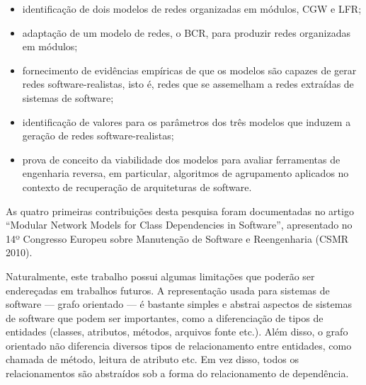 \begin{itemize}
	\item identificação de dois modelos de redes organizadas em módulos, CGW e LFR;
	\item adaptação de um modelo de redes, o BCR, para produzir redes organizadas em módulos;
	\item fornecimento de evidências empíricas de que os modelos são capazes de gerar redes software-realistas, isto é, redes que se assemelham a redes extraídas de sistemas de software;
	\item identificação de valores para os parâmetros dos três modelos que induzem a geração de redes software-realistas;
	\item prova de conceito da viabilidade dos modelos para avaliar ferramentas de engenharia reversa, em particular, algoritmos de agrupamento aplicados no contexto de recuperação de arquiteturas de software. 
\end{itemize}

As quatro primeiras contribuições desta pesquisa foram documentadas no artigo ``Modular Network Models for Class Dependencies in Software'', apresentado no 14º Congresso Europeu sobre Manutenção de Software e Reengenharia (CSMR 2010). 


Naturalmente, este trabalho possui algumas limitações que poderão ser endereçadas em trabalhos futuros. A representação usada para sistemas de software --- grafo orientado --- é bastante simples e abstrai aspectos de sistemas de software que podem ser importantes, como a diferenciação de tipos de entidades (classes, atributos, métodos, arquivos fonte etc.). Além disso, o grafo orientado não diferencia diversos tipos de relacionamento entre entidades, como chamada de método, leitura de atributo etc. Em vez disso, todos os relacionamentos são abstraídos sob a forma do relacionamento de dependência.


